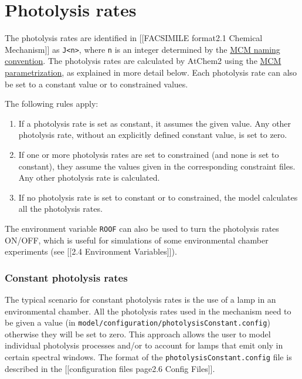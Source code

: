 \chapter{Photolysis rates}

The photolysis rates are identified in {[}{[}FACSIMILE
format\textbar{}2.1 Chemical Mechanism{]}{]} as
\texttt{J\textless{}n\textgreater{}}, where \texttt{n} is an integer
determined by the
\href{http://mcm.leeds.ac.uk/MCMv3.3.1/parameters/photolysis.htt}{MCM
naming convention}. The photolysis rates are calculated by AtChem2 using
the
\href{http://mcm.leeds.ac.uk/MCM/parameters/photolysis_param.htt}{MCM
parametrization}, as explained in more detail below. Each photolysis
rate can also be set to a constant value or to constrained values.

The following rules apply:

\begin{enumerate}
\def\labelenumi{\arabic{enumi}.}
\tightlist
\item
  If a photolysis rate is set as constant, it assumes the given value.
  Any other photolysis rate, without an explicitly defined constant
  value, is set to zero.
\item
  If one or more photolysis rates are set to constrained (and none is
  set to constant), they assume the values given in the corresponding
  constraint files. Any other photolysis rate is calculated.
\item
  If no photolysis rate is set to constant or to constrained, the model
  calculates all the photolysis rates.
\end{enumerate}

The environment variable \texttt{ROOF} can also be used to turn the
photolysis rates ON/OFF, which is useful for simulations of some
environmental chamber experiments (see {[}{[}2.4 Environment
Variables{]}{]}).

\hypertarget{constant-photolysis-rates}{%
\subsection{Constant photolysis rates}\label{constant-photolysis-rates}}

The typical scenario for constant photolysis rates is the use of a lamp
in an environmental chamber. All the photolysis rates used in the
mechanism need to be given a value (in
\texttt{model/configuration/photolysisConstant.config}) otherwise they
will be set to zero. This approach allows the user to model individual
photolysis processes and/or to account for lamps that emit only in
certain spectral windows. The format of the
\texttt{photolysisConstant.config} file is described in the
{[}{[}configuration files page\textbar{}2.6 Config Files{]}{]}.

